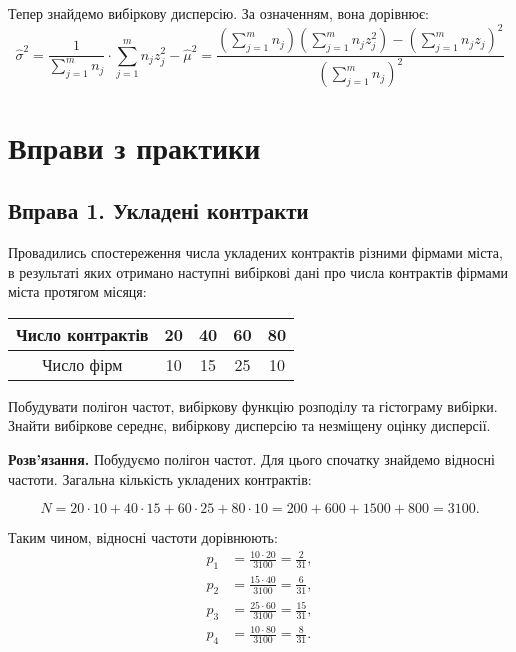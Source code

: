 \documentclass{hw_template}
\begin{document}
Тепер знайдемо вибіркову дисперсію. За означенням, вона дорівнює:
\begin{equation*}
    \hat{\sigma}^2 = \frac{1}{\sum_{j=1}^m n_j} \cdot \sum_{j=1}^m n_jz_j^2 - \hat{\mu}^2 = \frac{\left(\sum_{j=1}^m n_j\right)\left(\sum_{j=1}^m n_jz_j^2\right) - \left(\sum_{j=1}^m n_jz_j\right)^2}{\left(\sum_{j=1}^m n_j\right)^2}
\end{equation*}

\pagebreak

\section{Вправи з практики}

\subsection{Вправа 1. Укладені контракти}

\begin{problem}
    Провадились спостереження числа укладених контрактів різними фірмами міста, в результаті яких отримано наступні вибіркові дані про числа контрактів фірмами міста протягом місяця:

    \begin{center}
        \begin{tabular}{|c|c|c|c|c|}
            \hline
            Число контрактів & 20 & 40 & 60 & 80 \\
            \hline
            Число фірм & 10 & 15 & 25 & 10 \\
            \hline
        \end{tabular}
    \end{center}

    Побудувати полігон частот, вибіркову функцію розподілу та гістограму вибірки. Знайти вибіркове середнє, вибіркову дисперсію та незміщену оцінку дисперсії.
\end{problem}

\textbf{Розв'язання.} Побудуємо полігон частот. Для цього спочатку знайдемо відносні частоти. Загальна кількість укладених контрактів:

\begin{equation*}
    N = 20 \cdot 10 + 40 \cdot 15 + 60 \cdot 25 + 80 \cdot 10 = 200 + 600 + 1500 + 800 = 3100.
\end{equation*}

Таким чином, відносні частоти дорівнюють:
\begin{equation*}
    \begin{aligned}
        p_1 &= \frac{10 \cdot 20}{3100} = \frac{2}{31}, \\
        p_2 &= \frac{15 \cdot 40}{3100} = \frac{6}{31}, \\
        p_3 &= \frac{25 \cdot 60}{3100} = \frac{15}{31}, \\
        p_4 &= \frac{10 \cdot 80}{3100} = \frac{8}{31}.
    \end{aligned}
\end{equation*}
\end{document}

